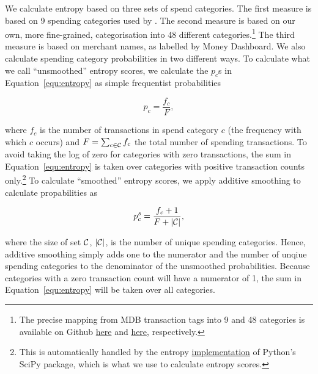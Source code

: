We calculate entropy based on three sets of spend categories. The first measure
is based on 9 spending categories used by \citet{muggleton2020evidence}. The
second measure is based on our own, more fine-grained, categorisation into 48
different categories.\footnote{The precise mapping from MDB transaction tags
    into 9 and 48 categories is available on Github
    \href{https://github.com/fabiangunzinger/entropy/blob/7fa9c565bf8959ea92a9d4fe2245da0864e19c27/src/data/txn_classifications.py\#L249}{here}
    and
    \href{https://github.com/fabiangunzinger/entropy/blob/7fa9c565bf8959ea92a9d4fe2245da0864e19c27/src/data/txn_classifications.py\#L503}{here},
respectively.} The third measure is based on merchant names, as labelled by
Money Dashboard. We also calculate spending category probabilities in two
different ways. To calculate what we call ``unsmoothed'' entropy scores, we
calculate the $p_c$s in Equation~\ref{equ:entropy} as simple frequentist
probabilities

\begin{equation}
    p_c = \frac{f_c}{F},
\end{equation}

\noindent where $f_c$ is the number of transactions in spend category $c$ (the
frequency with which $c$ occurs) and $F = \sum_{c \in \mathcal{C}}f_c$ the total
number of spending transactions. To avoid taking the log of zero for categories
with zero transactions, the sum in Equation~\ref{equ:entropy} is taken over
categories with positive transaction counts only.\footnote{This is
    automatically handled by the entropy
    \href{https://docs.scipy.org/doc/scipy/reference/generated/scipy.stats.entropy.html}{implementation}
of Python's SciPy package, which is what we use to calculate entropy scores.}
To calculate ``smoothed'' entropy scores, we apply additive smoothing to
calculate propabilities as

\begin{equation}
    \label{equ:prob_s}
    p_c^{s} = \frac{f_c + 1}{F + |\mathcal{C}|},
\end{equation}

\noindent where the size of set $\mathcal{C}$, $|\mathcal{C}|$, is the number of unique
spending categories. Hence, additive smoothing simply adds one to the numerator
and the number of unqiue spending categories to the denominator of the
unsmoothed probabilities. Because categories with a zero transaction count will
have a numerator of 1, the sum in Equation~\ref{equ:entropy} will be taken over
all categories.

